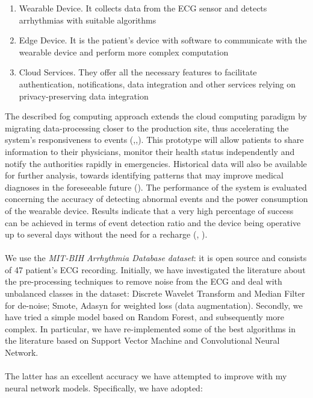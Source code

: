 \documentclass[LaM,binding=0.6cm]{sapthesis}
\begin{document}
\begin{enumerate}
\item Wearable Device. It collects data from the ECG sensor and detects arrhythmias with suitable algorithms
\item Edge Device. It is the patient's device with software to communicate with the wearable device and perform more complex computation
\item Cloud Services. They offer all the necessary features to facilitate authentication, notifications, data integration and other services relying on privacy-preserving data integration
\end{enumerate}
The described fog computing approach extends the cloud computing paradigm by migrating data-processing closer to the production site, thus accelerating the system's responsiveness to events (\cite{ufcf},\cite{ufcf2},\cite{fog}). This prototype will allow patients to share information to their physicians, monitor their health status independently and notify the authorities rapidly in emergencies. Historical data will also be available for further analysis, towards identifying patterns that may improve medical diagnoses in the foreseeable future (\cite{otdo}). The performance of the system is evaluated concerning the accuracy of detecting abnormal events and the power consumption of the wearable device. Results indicate that a very high percentage of success can be achieved in terms of event detection ratio and the device being operative up to several days without the need for a recharge (\cite{potf}, \cite{aoat}).\\\\We use the \textit{MIT-BIH Arrhythmia Database dataset}: it is open source and consists of 47 patient's ECG recording. Initially, we have investigated the literature about the pre-processing techniques to remove noise from the ECG and deal with unbalanced classes in the dataset: Discrete Wavelet Transform and Median Filter for de-noise; Smote, Adasyn for weighted loss (data augmentation). Secondly, we have tried a simple model based on Random Forest, and subsequently more complex. In particular, we have re-implemented some of the best algorithms in the literature based on Support Vector Machine and Convolutional Neural Network.\\\\The latter has an excellent accuracy we have attempted to improve with my neural network models. Specifically, we have adopted:
\end{document}
